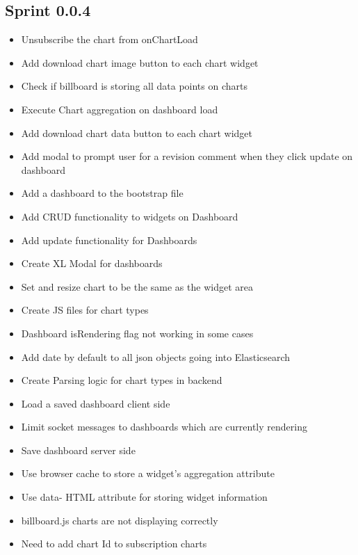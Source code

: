 \documentclass[12pt]{report}
\begin{document}
\subsection*{Sprint 0.0.4}
\begin{itemize}
\item Unsubscribe the chart from onChartLoad
\item Add download chart image button to each chart widget
\item Check if billboard is storing all data points on charts
\item Execute Chart aggregation on dashboard load
\item Add download chart data button to each chart widget
\item Add modal to prompt user for a revision comment when they click update on dashboard
\item Add a dashboard to the bootstrap file
\item Add CRUD functionality to widgets on Dashboard
\item Add update functionality for Dashboards
\item Create XL Modal for dashboards
\item Set and resize chart to be the same as the widget area
\item Create JS files for chart types
\item Dashboard isRendering flag not working in some cases
\item Add date by default to all json objects going into Elasticsearch
\item Create Parsing logic for chart types in backend
\item Load a saved dashboard client side
\item Limit socket messages to dashboards which are currently rendering
\item Save dashboard server side
\item Use browser cache to store a widget's aggregation attribute
\item Use data- HTML attribute for storing widget information
\item billboard.js charts are not displaying correctly
\item Need to add chart Id to subscription charts
\end{itemize}
\end{document}
